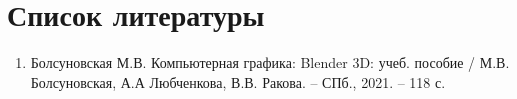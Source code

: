 \documentclass[areasetadvanced]{scrartcl}
\begin{document}
\newpage
\section*{Список литературы}
\begin{enumerate}
    \item  Болсуновская М.В. Компьютерная графика: Blender 3D: учеб. пособие / М.В.
Болсуновская, А.А Любченкова, В.В. Ракова. – СПб., 2021. – 118 с.
\end{enumerate}
\end{document}
